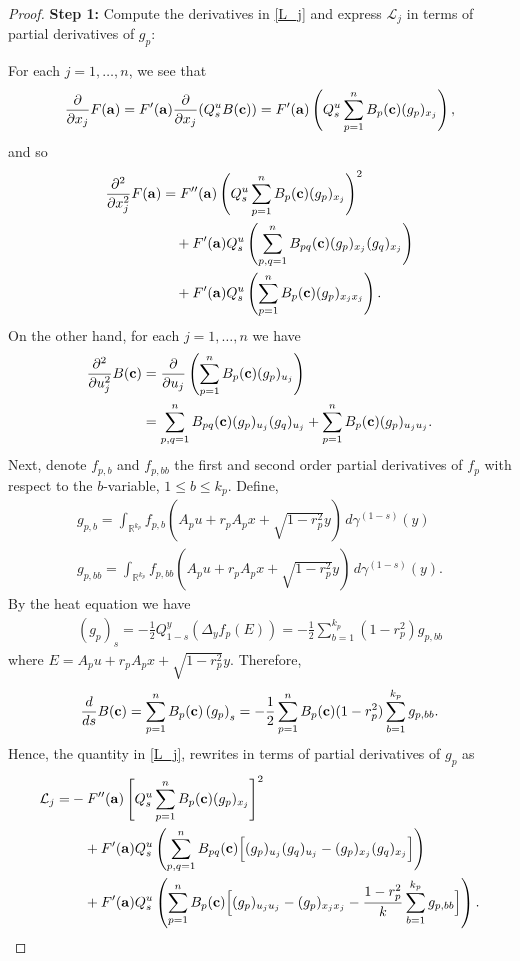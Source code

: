 \documentclass[9pt, a4paper]{amsart}
\newcommand{\1}{{\chi_{}}}%
\numberwithin{equation}{section}
\begin{document}
\begin{proof}
{\textbf{Step 1:}} Compute the derivatives in \eqref{L_j} and express $\mathcal{L}_j$ in terms of partial derivatives of  $g_p$:

\vspace{0.2cm}

For each $j=1,\ldots,n$, we see that
\begin{equation*}
	\frac{\partial}{\partial x_j}F({\bf{a}})=F'({\bf{a}})	\frac{\partial}{\partial x_j}(Q_s^uB({\bf{c}}))=F'({\bf{a}})\left(Q_s^u\sum_{p=1}^nB_{p}({\bf{c}})(g_p)_{x_j}\right),
\end{equation*}
and so
\begin{align*}
	\frac{\partial^2}{\partial x_j^2}F({\bf{a}})&=F''({\bf{a}})\left(Q_s^u\sum_{p=1}^nB_{p}({\bf{c}})(g_p)_{x_j}\right)^2\\
	&\quad+F'({\bf{a}})Q_s^u\left(\sum_{p,q=1}^{n}B_{pq}({\bf{c}})(g_p)_{x_j}(g_q)_{x_j} \right)\\
	&\quad+F'({\bf{a}})Q_s^u\left( \sum_{p=1}^nB_{p}({\bf{c}})(g_p)_{x_jx_j}\right).
\end{align*}
On the other hand, for each $j=1,\ldots,n$ we have
\begin{align*}
	\frac{\partial^2}{\partial u_j^2}B({\bf{c}})&=\frac{\partial}{\partial u_j}\left(\sum_{p=1}^nB_{p}({\bf{c}})(g_p)_{u_j}\right)\\
	&=\sum_{p,q=1}^{n}B_{pq}({\bf{c}})(g_p)_{u_j}(g_q)_{u_j}+\sum_{p=1}^nB_{p}({\bf{c}})(g_p)_{u_ju_j}.
\end{align*}
Next, denote $f_{p,b}$ and $f_{p,bb}$ the first and second order partial derivatives of \(f_p\) with respect to the $b$-variable, $1 \leq b \leq k_p$. Define,
\begin{align*}
g_{p,b}= \int_{\mathbb{R}^{k_p}} f_{p,b}(A_p u + r_p A_p x + \sqrt{1 - r_p^2} y) \, d\gamma^{(1-s)}(y)\\
g_{p,bb}= \int_{\mathbb{R}^{k_p}} f_{p,bb}(A_p u + r_p A_p x + \sqrt{1 - r_p^2} y) \, d\gamma^{(1-s)}(y).
\end{align*}
By the heat equation we have
\begin{align*}
	(g_p)_s	=-\frac{1}{2}Q_{1-s}^y (\Delta_y f_p(E))=-\frac{1}{2}\sum_{b=1}^{k_p}(1-r_p^2)g_{p,bb}
\end{align*}
where $E=A_pu+r_pA_px+\sqrt{1-r_p^2}y$. Therefore,
\begin{align*}
	\frac{d}{ds}B({\bf{c}})=\sum_{p=1}^nB_{p}({\bf{c}})\left(g_p\right)_s=-\frac{1}{2}\sum_{p=1}^nB_{p}({\bf{c}})(1-r_p^2)\sum_{ b=1}^{k_p}g_{p,bb}.
\end{align*}
Hence, the quantity in \eqref{L_j}, rewrites in terms of partial derivatives of $g_p$ as
\begin{align}\label{L_jwithg_p}
	\mathcal{L}_j=&-F''({\bf{a}})\left[Q_s^u\sum_{p=1}^nB_{p}({\bf{c}})(g_p)_{x_j}\right]^2\\   
	&\nonumber\quad+F'({\bf{a}})Q_s^u\left(\sum_{p,q=1}^{n}B_{pq}({\bf{c}})\Big[(g_p)_{u_j}(g_q)_{u_j}-(g_p)_{x_j}(g_q)_{x_j}\Big] \right)\\
	&\nonumber\quad+F'({\bf{a}})Q_s^u\left(\sum_{p=1}^nB_{p}({\bf{c}})\Big[(g_p)_{u_ju_j}-(g_p)_{x_jx_j}-\frac{1-r_p^2}{k}\sum_{ b=1}^{k_p}g_{p,bb}\Big]\right).
\end{align}


\end{proof}
\end{document}
